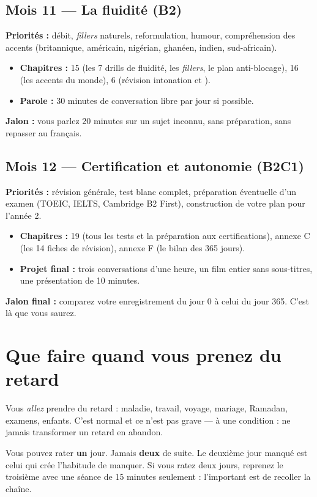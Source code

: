 \subsection{Mois 11 --- La fluidité (B2)}
\textbf{Priorités :} débit, \emph{fillers} naturels, reformulation, humour, compréhension
des accents (britannique, américain, nigérian, ghanéen, indien, sud-africain).

\begin{itemize}
  \item \textbf{Chapitres :} 15 (les 7 drills de fluidité, les \emph{fillers}, le plan
  anti-blocage), 16 (les accents du monde), 6 (révision intonation et ).
  \item \textbf{Parole :} 30 minutes de conversation libre par jour si possible.
\end{itemize}
\textbf{Jalon :} vous parlez 20 minutes sur un sujet inconnu, sans préparation, sans
repasser au français.

\subsection{Mois 12 --- Certification et autonomie (B2\ra C1)}
\textbf{Priorités :} révision générale, test blanc complet, préparation éventuelle d'un
examen (TOEIC, IELTS, Cambridge B2 First), construction de votre plan pour l'année 2.

\begin{itemize}
  \item \textbf{Chapitres :} 19 (tous les tests et la préparation aux certifications), annexe C (les 14 fiches de révision), annexe F (le bilan des 365 jours).
  \item \textbf{Projet final :} trois conversations d'une heure, un film entier sans
  sous-titres, une présentation de 10 minutes.
\end{itemize}
\textbf{Jalon final :} comparez votre enregistrement du jour 0 à celui du jour 365.
C'est là que vous saurez.

\section{Que faire quand vous prenez du retard}
Vous \emph{allez} prendre du retard : maladie, travail, voyage, mariage, Ramadan, examens,
enfants. C'est normal et ce n'est pas grave --- à une condition : ne jamais transformer un
retard en abandon.

\begin{regle}
Vous pouvez rater \textbf{un} jour. Jamais \textbf{deux} de suite. Le deuxième jour manqué
est celui qui crée l'habitude de manquer. Si vous ratez deux jours, reprenez le troisième
avec une séance de 15 minutes seulement : l'important est de recoller la chaîne.
\end{regle}

